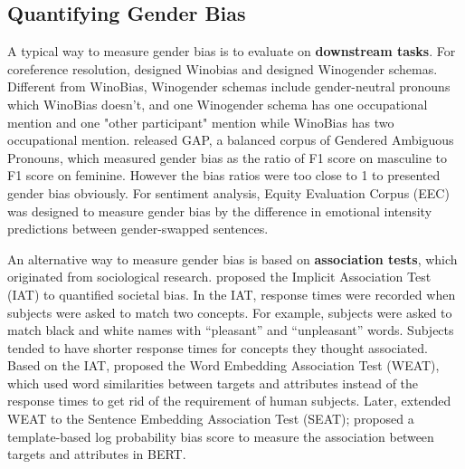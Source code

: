 \subsection{Quantifying Gender Bias}
A typical way to measure gender bias is to evaluate on \textbf{downstream tasks}. For coreference resolution, \citet{zhao2018gender} designed Winobias and \citet{rudinger2018gender} designed Winogender schemas. Different from WinoBias, Winogender schemas include gender-neutral pronouns which WinoBias doesn't, and one Winogender schema has one occupational mention and one "other participant" mention while WinoBias has two occupational mention. \citet{webster2018mind} released GAP, a balanced corpus of Gendered Ambiguous Pronouns, which measured gender bias as the ratio of F1 score on masculine to F1 score on feminine. However the bias ratios were too close to 1 \citep{Chada_2019, Attree_2019} to presented gender bias obviously. For sentiment analysis, Equity Evaluation Corpus (EEC) \citep{Kiritchenko_2018} was designed to measure gender bias by the difference in emotional intensity predictions between gender-swapped sentences.

An alternative way to measure gender bias is based on \textbf{association tests}, which originated from sociological research. \citet{greenwald1998measuring} proposed the Implicit Association Test (IAT) to quantified societal bias. In the IAT, response times were recorded when subjects were asked to match two concepts. For example, subjects were asked to match black and white names with “pleasant” and “unpleasant” words. Subjects tended to have shorter response times for concepts they thought associated. Based on the IAT, \citet{caliskan2017semantics} proposed the Word Embedding Association Test (WEAT), which used word similarities between targets and attributes instead of the response times to get rid of the requirement of human subjects. Later, \citet{may2019measuring} extended WEAT to the Sentence Embedding Association Test (SEAT); \citet{kurita2019measuring} proposed a template-based log probability bias score to measure the association between targets and attributes in BERT.

